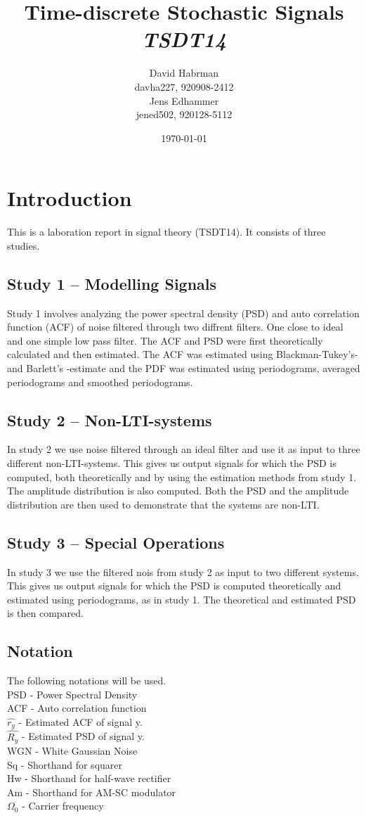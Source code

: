 \documentclass[10pt]{article}
\title{Time-discrete Stochastic Signals\\
\emph{TSDT14}}
\author{David Habrman \\ davha227, 920908-2412\\
Jens Edhammer \\ jened502, 920128-5112 }
\date{\today}
\begin{document}
\maketitle

\section{Introduction}
This is a laboration report in signal theory (TSDT14). It consists of three studies.

\subsection{Study 1 – Modelling Signals}
Study 1 involves analyzing the power spectral density (PSD) and auto correlation function (ACF)
of noise filtered through two diffrent filters. One close to ideal and one simple low pass filter.
The ACF and PSD were first theoretically calculated and then estimated.
The ACF was estimated using Blackman-Tukey's- and Barlett's -estimate and the
PDF was estimated using periodograms, averaged periodograms and smoothed periodograms.

\subsection{Study 2 – Non-LTI-systems}
In study 2 we use noise filtered through an ideal filter and use it as input to three different non-LTI-systems.
This gives us output signals for which the PSD is computed, both theoretically and by using the estimation methods
from study 1. The  amplitude distribution is also computed. Both the PSD and the  amplitude distribution are then used
to demonstrate that the systems are non-LTI.

\subsection{Study 3 – Special Operations}
In study 3 we use the filtered nois from study 2 as input to two different systems.
This gives us output signals for which the PSD is computed theoretically and estimated using
periodograms, as in study 1. The theoretical and estimated PSD is then compared.

\subsection{Notation}
The following notations will be used. \\
PSD - Power Spectral Density \\
ACF - Auto correlation function \\
$\hat{r_y}$ - Estimated ACF of signal y. \\
$\hat{R_y}$ - Estimated PSD of signal y. \\
WGN - White Gaussian Noise\\
Sq - Shorthand for squarer\\
Hw - Shorthand for half-wave rectifier\\
Am - Shorthand for AM-SC modulator\\
$\Omega_0$ - Carrier frequency\\
\end{document}
